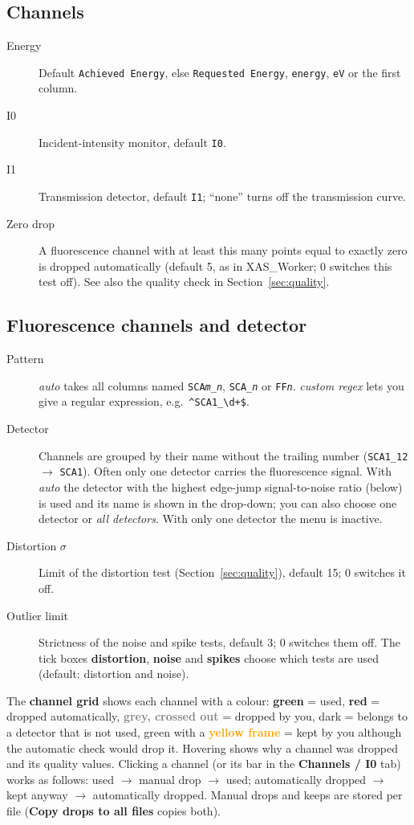 \documentclass[11pt,a4paper]{article}
\newcommand{\ui}[1]{\textsf{\textbf{#1}}}          %
\newcommand{\col}[1]{\texttt{#1}}                  %
\begin{document}
\subsection{Channels}
\begin{description}
  \item[Energy] Default \col{Achieved Energy}, else \col{Requested Energy}, \col{energy}, \col{eV}
        or the first column.
  \item[I0] Incident-intensity monitor, default \col{I0}.
  \item[I1] Transmission detector, default \col{I1}; ``none'' turns off the transmission curve.
  \item[Zero drop] A fluorescence channel with at least this many points equal to exactly zero is
        dropped automatically (default 5, as in XAS\_Worker; 0 switches this test off). See also the
        quality check in Section~\ref{sec:quality}.
\end{description}

\subsection{Fluorescence channels and detector}
\begin{description}
  \item[Pattern] \emph{auto} takes all columns named \col{SCA\textit{m}\_\textit{n}},
        \col{SCA\_\textit{n}} or \col{FF\textit{n}}. \emph{custom regex} lets you give a regular
        expression, e.g.\ \verb|^SCA1_\d+$|.
  \item[Detector] Channels are grouped by their name without the trailing number
        (\col{SCA1\_12} $\to$ \col{SCA1}). Often only one detector carries the fluorescence signal. With
        \emph{auto} the detector with the highest edge-jump signal-to-noise ratio (below) is used and its
        name is shown in the drop-down; you can also choose one detector or \emph{all detectors}. With only
        one detector the menu is inactive.
  \item[Distortion $\sigma$] Limit of the distortion test (Section~\ref{sec:quality}), default 15;
        0 switches it off.
  \item[Outlier limit] Strictness of the noise and spike tests, default 3; 0 switches them off.
        The tick boxes \ui{distortion}, \ui{noise} and \ui{spikes} choose which tests are used
        (default: distortion and noise).
\end{description}

The \textbf{channel grid} shows each channel with a colour:
\textcolor{green!50!black}{\textbf{green}} = used,
\textcolor{red!70!black}{\textbf{red}} = dropped automatically,
\textcolor{gray}{\textbf{grey, crossed out}} = dropped by you,
dark = belongs to a detector that is not used,
green with a \textcolor{orange}{\textbf{yellow frame}} = kept by you although the automatic check would drop it.
Hovering shows why a channel was dropped and its quality values. Clicking a channel
(or its bar in the \ui{Channels / I0} tab) works as follows:
used $\to$ manual drop $\to$ used; automatically dropped $\to$ kept anyway $\to$ automatically dropped.
Manual drops and keeps are stored per file (\ui{Copy drops to all files} copies both).
\end{document}
